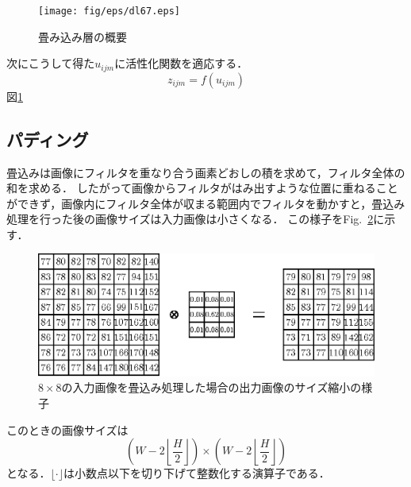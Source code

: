 \documentclass[a4paper,10pt]{jsarticle}
\begin{document}
\begin{figure}[t]
 \centering
 \texttt{[image: fig/eps/dl67.eps]}
  \caption{畳み込み層の概要}
  \label{fig:畳み込み層の概要}
\end{figure}

次にこうして得た$u_{ijm}$に活性化関数を適応する．
\begin{equation}
 z_{ijm}=f(u_{ijm})
\end{equation}
図\ref{fig:畳み込み層の概要}

\subsection{パディング}
畳込みは画像にフィルタを重なり合う画素どおしの積を求めて，フィルタ全体の和を求める．
したがって画像からフィルタがはみ出すような位置に重ねることができず，画像内にフィルタ全体が収まる範囲内でフィルタを動かすと，畳込み処理を行った後の画像サイズは入力画像は小さくなる．
この様子をFig.~\ref{fig:88の入力画像を畳込み処理した場合の出力画像のサイズ縮小の様子}に示す．
\begin{figure}[ht]
  \begin{center}
    \includegraphics[clip,scale=0.8]{fig/eps/convolution.eps}
  \end{center}
  \caption{$8\times 8$の入力画像を畳込み処理した場合の出力画像のサイズ縮小の様子}
  \label{fig:88の入力画像を畳込み処理した場合の出力画像のサイズ縮小の様子}
\end{figure}

このときの画像サイズは
\begin{equation}
  \left(W-2\left\lfloor \frac{H}{2}\right\rfloor\right)\times \left(W-2\left\lfloor \frac{H}{2}\right\rfloor\right)
\end{equation}
となる．$\lfloor \cdot \rfloor$は小数点以下を切り下げて整数化する演算子である．
\end{document}
